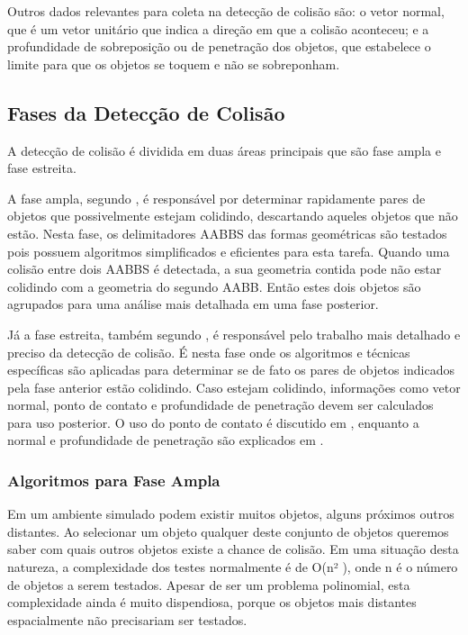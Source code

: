 Outros dados relevantes para coleta na detecção de colisão são: o vetor normal, que é um vetor unitário que indica a direção em que a colisão aconteceu; e  a profundidade de sobreposição ou de penetração dos objetos, que estabelece o limite para que os objetos se toquem e não se sobreponham.

	\subsection{Fases da Detecção de Colisão}
A detecção de colisão é dividida em duas áreas principais que são fase ampla e fase estreita.

A fase ampla, segundo , é responsável por determinar rapidamente pares de objetos que possivelmente estejam colidindo, descartando aqueles objetos que não estão.
Nesta fase, os delimitadores AABBS das formas geométricas são testados pois possuem algoritmos simplificados e eficientes para esta tarefa.
Quando uma colisão entre dois AABBS é detectada, a sua geometria contida pode não estar colidindo com a geometria do segundo AABB. Então estes dois objetos são agrupados para uma análise mais detalhada em uma fase posterior.

Já a fase estreita, também segundo ,  é responsável pelo trabalho mais detalhado e preciso da detecção de colisão.
É nesta fase onde os algoritmos e técnicas específicas são aplicadas para determinar se de fato os pares de objetos indicados pela fase anterior estão colidindo.
Caso estejam colidindo, informações como vetor normal, ponto de contato e profundidade de penetração devem ser calculados para uso posterior.
O uso do ponto de contato é discutido em , enquanto a normal e profundidade de penetração são explicados em .
\subsubsection{Algoritmos para Fase Ampla}
Em um ambiente simulado podem existir muitos objetos, alguns próximos outros distantes. 
Ao selecionar um objeto qualquer deste conjunto de objetos queremos saber com quais outros objetos existe a chance de colisão. 
Em uma situação desta natureza, a complexidade dos testes normalmente é de O(n² ), onde n é o número de objetos a serem
testados. Apesar de ser um problema polinomial, esta complexidade ainda é muito dispendiosa, porque os objetos mais distantes espacialmente não precisariam ser testados.


